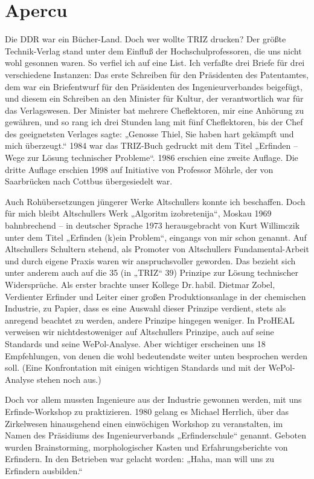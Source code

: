 \documentclass[11pt,a4paper]{article}
\begin{document}
\section*{Apercu}

\enlargethispage{-2em}
Die DDR war ein Bücher-Land. Doch wer wollte {TRIZ} drucken? Der größte
Technik-Verlag stand unter dem Einfluß der Hochschulprofessoren, die uns nicht
wohl gesonnen waren. So verfiel ich auf eine List. Ich verfaßte drei Briefe für
drei verschiedene Instanzen: Das erste Schreiben für den Präsidenten des
Patentamtes, dem war ein Briefentwurf für den Präsidenten des
Ingenieurverbandes beigefügt, und diesem ein Schreiben an den Minister für
Kultur, der verantwortlich war für das Verlagswesen. Der Minister bat mehrere
Cheflektoren, mir eine Anhörung zu gewähren, und so rang ich drei Stunden lang
mit fünf Cheflektoren, bis der Chef des geeignetsten Verlages sagte: „Genosse
Thiel, Sie haben hart gekämpft und mich überzeugt.“ 1984 war das {TRIZ}-Buch
gedruckt mit dem Titel „Erfinden – Wege zur Lösung technischer Probleme“. 1986
erschien eine zweite Auflage. Die dritte Auflage erschien 1998 auf Initiative
von Professor Möhrle, der von Saarbrücken nach Cottbus übergesiedelt war.

Auch Rohübersetzungen jüngerer Werke Altschullers konnte ich beschaffen. Doch
für mich bleibt Altschullers Werk „Algoritm izobretenija“, Moskau 1969
bahnbrechend – in deutscher Sprache 1973 herausgebracht von Kurt Willimczik
unter dem Titel „Erfinden (k)ein Problem“, eingangs von mir schon genannt. Auf
Altschullers Schultern stehend, als Promoter von Altschullers
Fundamental-Arbeit und durch eigene Praxis waren wir anspruchsvoller geworden.
Das bezieht sich unter anderem auch auf die 35 (in „TRIZ“ 39) Prinzipe zur
Lösung technischer Widersprüche. Als erster brachte unser Kollege Dr.\,habil.
Dietmar Zobel, Verdienter Erfinder und Leiter einer großen Produktionsanlage in
der chemischen Industrie, zu Papier, dass es eine Auswahl dieser Prinzipe
verdient, stets als anregend beachtet zu werden, andere Prinzipe hingegen
weniger. In ProHEAL verweisen wir nichtdestoweniger auf Altschullers Prinzipe,
auch auf seine Standards und seine WePol-Analyse. Aber wichtiger erscheinen uns
18 Empfehlungen, von denen die wohl bedeutendste weiter unten besprochen werden
soll.  (Eine Konfrontation mit einigen wichtigen Standards und mit der
WePol-Analyse stehen noch aus.)

Doch vor allem mussten Ingenieure aus der Industrie gewonnen werden, mit uns
Erfinde-Workshop zu praktizieren.  1980 gelang es Michael Herrlich, über das
Zirkelwesen hinausgehend einen einwöchigen Workshop zu veranstalten, im Namen
des Präsidiums des Ingenieurverbands „Erfinderschule“ genannt. Geboten wurden
Brainstorming, morphologischer Kasten und Erfahrungsberichte von Erfindern. In
den Betrieben war gelacht worden: „Haha, man will uns zu Erfindern ausbilden.“
\end{document}
